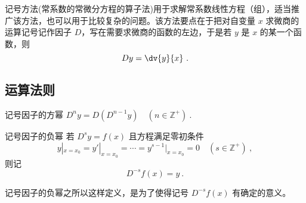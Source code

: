 

记号方法(常系数的常微分方程的算子法)用于求解常系数线性方程（组），适当推广该方法，也可以用于比较复杂的问题。该方法要点在于把对自变量 $x$ 求微商的运算记号记作因子 $D$，写在需要求微商的函数的左边，于是若 $y$ 是 $x$ 的某一个函数，则
\begin{equation}\label{eq_Sign_10}
Dy=\dv{y}{x}~.
\end{equation}
\subsection{运算法则}
\begin{definition}{记号因子的方幂}\label{def_Sign_1}
$D^ny=D(D^{n-1}y)\quad(n\in\mathbb{Z^{+}})~.$
\end{definition}
\begin{definition}{记号因子的负幂}\label{def_Sign_2}
若 $D^sy=f(x)$ 且方程满足零初条件
\begin{equation}\label{eq_Sign_5}
y|_{x=x_0}=y'|_{x=x_0}=\cdots=y^{s-1}|_{x=x_0}=0\quad({s\in\mathbb{Z^{+}}})~,
\end{equation}
则记
\begin{equation}
D^{-s}f(x)=y~.
\end{equation}
\end{definition}
记号因子的负幂之所以这样定义，是为了使得记号 $D^{-s}f(x)$ 有确定的意义。

